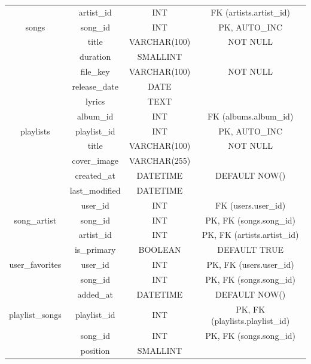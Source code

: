 \documentclass{base}
\begin{document}
\begin{longtable}{@{}cccc@{}}
                & artist\_id         & INT          & FK (artists.artist\_id)         \\
songs           & song\_id           & INT          & PK, AUTO\_INC                   \\
                & title              & VARCHAR(100) & NOT NULL                        \\
                & duration           & SMALLINT     &                                 \\
                & file\_key          & VARCHAR(100) & NOT NULL                        \\
                & release\_date      & DATE         &                                 \\
                & lyrics             & TEXT         &                                 \\
                & album\_id          & INT          & FK (albums.album\_id)           \\
playlists       & playlist\_id       & INT          & PK, AUTO\_INC                   \\
                & title              & VARCHAR(100) & NOT NULL                        \\
                & cover\_image       & VARCHAR(255) &                                 \\
                & created\_at        & DATETIME     & DEFAULT NOW()                   \\
                & last\_modified     & DATETIME     &                                 \\
                & user\_id           & INT          & FK (users.user\_id)             \\
song\_artist    & song\_id           & INT          & PK, FK (songs.song\_id)         \\
                & artist\_id         & INT          & PK, FK (artists.artist\_id)     \\
                & is\_primary        & BOOLEAN      & DEFAULT TRUE                    \\
user\_favorites & user\_id           & INT          & PK, FK (users.user\_id)         \\
                & song\_id           & INT          & PK, FK (songs.song\_id)         \\
                & added\_at          & DATETIME     & DEFAULT NOW()                   \\
playlist\_songs & playlist\_id       & INT          & PK, FK (playlists.playlist\_id) \\
                & song\_id           & INT          & PK, FK (songs.song\_id)         \\
                & position           & SMALLINT     &                                 \\* \bottomrule
\end{longtable}
\end{document}
